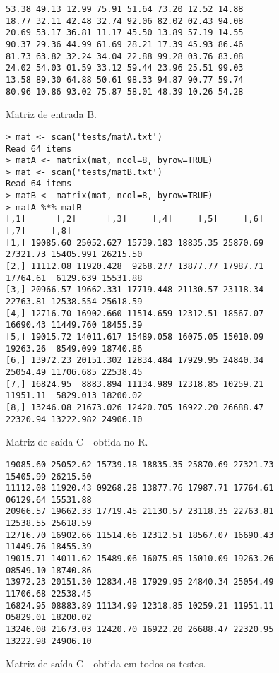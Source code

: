 \documentclass[conference]{IEEEtran}
\begin{document}
\begin{figure}[htb!]
	\begin{adjustbox}{max width=\linewidth}
		\begin{BVerbatim}
53.38 49.13 12.99 75.91 51.64 73.20 12.52 14.88
18.77 32.11 42.48 32.74 92.06 82.02 02.43 94.08
20.69 53.17 36.81 11.17 45.50 13.89 57.19 14.55
90.37 29.36 44.99 61.69 28.21 17.39 45.93 86.46
81.73 63.82 32.24 34.04 22.88 99.28 03.76 83.08
24.02 54.03 01.59 33.12 59.44 23.96 25.51 99.03
13.58 89.30 64.88 50.61 98.33 94.87 90.77 59.74
80.96 10.86 93.02 75.87 58.01 48.39 10.26 54.28
		\end{BVerbatim}
	\end{adjustbox}
	\caption{Matriz de entrada B.\label{fig:matB}}
\end{figure}

\begin{figure}[htb!]
\begin{adjustbox}{max width=\linewidth}
\begin{BVerbatim}
> mat <- scan('tests/matA.txt')
Read 64 items
> matA <- matrix(mat, ncol=8, byrow=TRUE)
> mat <- scan('tests/matB.txt')
Read 64 items
> matB <- matrix(mat, ncol=8, byrow=TRUE)
> matA %
[,1]      [,2]      [,3]     [,4]     [,5]     [,6]      [,7]     [,8]
[1,] 19085.60 25052.627 15739.183 18835.35 25870.69 27321.73 15405.991 26215.50
[2,] 11112.08 11920.428  9268.277 13877.77 17987.71 17764.61  6129.639 15531.88
[3,] 20966.57 19662.331 17719.448 21130.57 23118.34 22763.81 12538.554 25618.59
[4,] 12716.70 16902.660 11514.659 12312.51 18567.07 16690.43 11449.760 18455.39
[5,] 19015.72 14011.617 15489.058 16075.05 15010.09 19263.26  8549.099 18740.86
[6,] 13972.23 20151.302 12834.484 17929.95 24840.34 25054.49 11706.685 22538.45
[7,] 16824.95  8883.894 11134.989 12318.85 10259.21 11951.11  5829.013 18200.02
[8,] 13246.08 21673.026 12420.705 16922.20 26688.47 22320.94 13222.982 24906.10
\end{BVerbatim}
\end{adjustbox}
\caption{Matriz de saída C - obtida no R. \label{fig:matC-R}}
\end{figure}

\begin{figure}[htb!]
	\begin{adjustbox}{max width=\linewidth}
		\begin{BVerbatim}
19085.60 25052.62 15739.18 18835.35 25870.69 27321.73 15405.99 26215.50
11112.08 11920.43 09268.28 13877.76 17987.71 17764.61 06129.64 15531.88
20966.57 19662.33 17719.45 21130.57 23118.35 22763.81 12538.55 25618.59
12716.70 16902.66 11514.66 12312.51 18567.07 16690.43 11449.76 18455.39
19015.71 14011.62 15489.06 16075.05 15010.09 19263.26 08549.10 18740.86
13972.23 20151.30 12834.48 17929.95 24840.34 25054.49 11706.68 22538.45
16824.95 08883.89 11134.99 12318.85 10259.21 11951.11 05829.01 18200.02
13246.08 21673.03 12420.70 16922.20 26688.47 22320.95 13222.98 24906.10
		\end{BVerbatim}
	\end{adjustbox}
	\caption{Matriz de saída C - obtida em todos os testes. \label{fig:matC}}
\end{figure}
\end{document}
